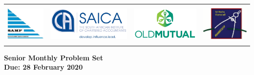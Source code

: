 \documentclass{article}
\begin{document}
\setlength{\tabcolsep}{6pt}
\begin{center} \begin{tabular}{cccc}
	\includegraphics[height=56pt]{SAMF_logo.jpg} &
	\includegraphics[height=56pt]{SAICA_logo.jpg} &
	\includegraphics[height=56pt]{OM_Logo_Stacked_Vignette_on_White_RGB.jpg} &
	\includegraphics[height=56pt]{SAMO2019.png}
\end{tabular} \end{center}


\bigskip


\begin{center}
\textbf{\Large Senior Monthly Problem Set}
\\ \vspace{1em}
\textbf{\large Due: 28 February 2020}
\end{center}
\end{document}
